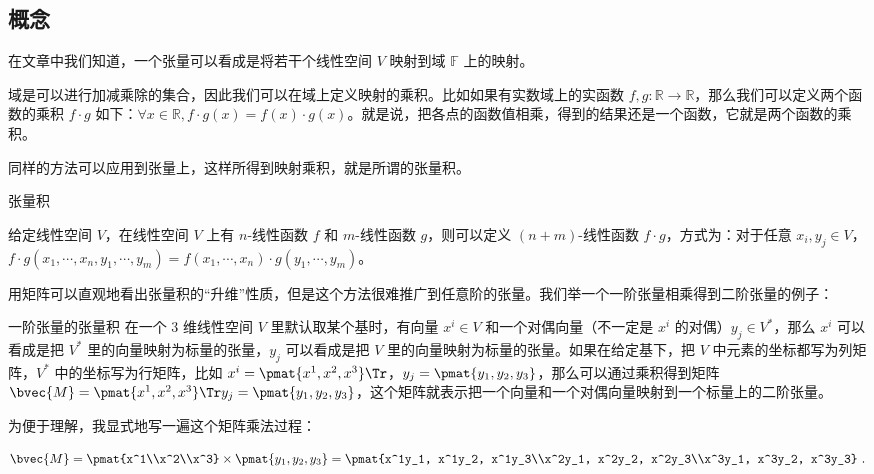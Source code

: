 


\subsection{概念}
在文章中我们知道，一个张量可以看成是将若干个线性空间 $V$ 映射到域 $\mathbb{F}$ 上的映射。

域是可以进行加减乘除的集合，因此我们可以在域上定义映射的乘积。比如如果有实数域上的实函数 $f, g:\mathbb{R} \rightarrow \mathbb{R}$，那么我们可以定义两个函数的乘积 $f \cdot g$ 如下：$\forall x \in \mathbb{R}, f \cdot g(x) = f(x) \cdot g(x)$。就是说，把各点的函数值相乘，得到的结果还是一个函数，它就是两个函数的乘积。

同样的方法可以应用到张量上，这样所得到映射乘积，就是所谓的张量积。

\begin{definition}{张量积}\label{def_TsrPrd_1}

给定线性空间 $V$，在线性空间 $V$ 上有 $n$-线性函数 $f$ 和 $m$-线性函数 $g$，则可以定义 $(n+m)$-线性函数 $f\cdot g$，方式为：对于任意 $x_i, y_j\in V$，$f\cdot g(x_1, \cdots, x_n, y_1, \cdots, y_m)=f(x_1, \cdots, x_n)\cdot g(y_1, \cdots, y_m)$。

\end{definition}

用矩阵可以直观地看出张量积的“升维”性质，但是这个方法很难推广到任意阶的张量。我们举一个一阶张量相乘得到二阶张量的例子：

\begin{example}{一阶张量的张量积}
在一个 $3$ 维线性空间 $V$ 里默认取某个基时，有向量 $x^i\in V$ 和一个对偶向量（不一定是 $x^i$ 的对偶）$y_j\in V^*$，那么 $x^i$ 可以看成是把 $V^*$ 里的向量映射为标量的张量，$y_j$ 可以看成是把 $V$ 里的向量映射为标量的张量。如果在给定基下，把 $V$ 中元素的坐标都写为列矩阵，$V^*$ 中的坐标写为行矩阵，比如 $x^i=\pmat{x^1, x^2, x^3}\Tr$，$y_j=\pmat{y_1, y_2, y_3}$，那么可以通过乘积得到矩阵 $\bvec{M}=\pmat{x^1, x^2, x^3}\Tr y_j=\pmat{y_1, y_2, y_3}$，这个矩阵就表示把一个向量和一个对偶向量映射到一个标量上的二阶张量。

为便于理解，我显式地写一遍这个矩阵乘法过程：

\begin{equation}
\bvec{M}=\pmat{x^1\\x^2\\x^3}\times\pmat{y_1, y_2, y_3}=\pmat{x^1y_1, x^1y_2, x^1y_3\\x^2y_1, x^2y_2, x^2y_3\\x^3y_1, x^3y_2, x^3y_3}~.
\end{equation}
\end{example}

